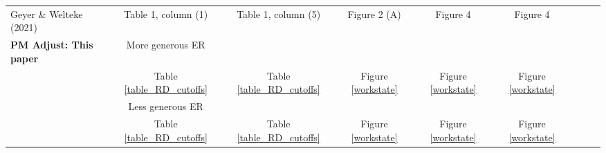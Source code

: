 \documentclass[12pt,a4paper]{article}
\begin{document}
\begin{sidewaystable}
\begin{tabular}{lccc cc ccc}
			Geyer \& Welteke (2021) &
			Table 1, column (1) & Table 1, column (5) &
			Figure 2 (A) & Figure 4 & Figure 4 \\ 
						
			\textbf{PM Adjust: This paper} & More generous ER \\
			& Table \ref{table_RD_cutoffs} & Table \ref{table_RD_cutoffs}  &
			Figure \ref{workstate} & Figure \ref{workstate} & Figure \ref{workstate} \\ 
			& Less generous ER & \\
                                & Table \ref{table_RD_cutoffs} & Table \ref{table_RD_cutoffs}  &
			Figure \ref{workstate} & Figure \ref{workstate} & Figure \ref{workstate} \\ 

			\bottomrule
		\end{tabular}
\end{sidewaystable}
\clearpage
\end{document}
